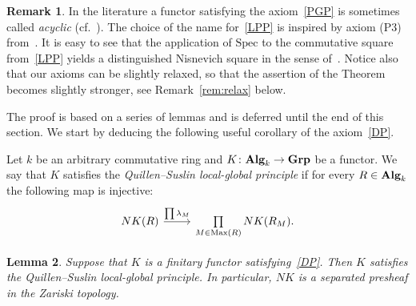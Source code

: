 \documentclass[oneside, 11pt]{amsart} \pdfoutput=1
\newcommand{\Max}{\mathrm{Max}}
\numberwithin{equation}{section}
\newtheorem{lemma}{Lemma} \numberwithin{lemma}{section}
\theoremstyle{definition}
\newtheorem{rem}[lemma]{Remark}
\newcommand{\catname}[1]{{\normalfont\textbf{#1}}} %
\begin{document}
\begin{rem}
 In the literature a functor satisfying the axiom~\ref{PGP} is sometimes called {\it acyclic} (cf.~\cite[Definition~III.4.1.1]{Kbook}).
The choice of the name for~\eqref{LPP} is inspired by axiom (P3) from~\cite[Proposition~3.3.4]{AHW18}. It is easy to see that the application of $\mathrm{Spec}$ to the commutative square from~\ref{LPP} yields a distinguished Nisnevich square in the sense of~\cite[Definition~3.1.3]{MV99}. Notice also that our axioms can be slightly relaxed, so that the assertion of the Theorem becomes slightly stronger, see Remark~\ref{rem:relax} below.
\end{rem}

The proof is based on a series of lemmas and is deferred until the end of this section. We start by deducing the following useful corollary of the axiom~\ref{DP}. 

Let $k$ be an arbitrary commutative ring and $K\colon \catname{Alg}_k \to \catname{Grp}$ be a functor.
We say that $K$ satisfies the {\it Quillen--Suslin local-global principle} if for every $R\in \catname{Alg}_k$ the following map is injective:
\begin{equation} \label{QS-def} \begin{tikzcd} NK(R) \ar{r}{\prod \lambda_M} & \prod\limits_{M \in \Max(R)} NK(R_M). \end{tikzcd} \end{equation}
\begin{lemma}\label{LGP}
Suppose that $K$ is a finitary functor satisfying~\ref{DP}. Then $K$ satisfies the Quillen--Suslin local-global principle. In particular, $NK$ is a separated presheaf in the Zariski topology.
\end{lemma}
\end{document}
